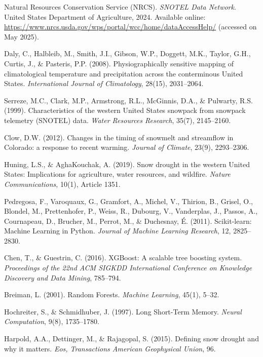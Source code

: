 \documentclass{article}
\begin{document}
\begin{thebibliography}{9}

Natural Resources Conservation Service (NRCS). 
\textit{SNOTEL Data Network}. 
United States Department of Agriculture, 2024. 
Available online: \url{https://www.nrcs.usda.gov/wps/portal/wcc/home/dataAccessHelp/} (accessed on May 2025).

Daly, C., Halbleib, M., Smith, J.I., Gibson, W.P., Doggett, M.K., Taylor, G.H., Curtis, J., \& Pasteris, P.P. (2008). 
Physiographically sensitive mapping of climatological temperature and precipitation across the conterminous United States.
\textit{International Journal of Climatology}, 28(15), 2031–2064.

Serreze, M.C., Clark, M.P., Armstrong, R.L., McGinnis, D.A., \& Pulwarty, R.S. (1999). 
Characteristics of the western United States snowpack from snowpack telemetry (SNOTEL) data.
\textit{Water Resources Research}, 35(7), 2145–2160.

Clow, D.W. (2012). 
Changes in the timing of snowmelt and streamflow in Colorado: a response to recent warming.
\textit{Journal of Climate}, 23(9), 2293–2306.

Huning, L.S., \& AghaKouchak, A. (2019). 
Snow drought in the western United States: Implications for agriculture, water resources, and wildfire.
\textit{Nature Communications}, 10(1), Article 1351.

Pedregosa, F., Varoquaux, G., Gramfort, A., Michel, V., Thirion, B., Grisel, O., Blondel, M., Prettenhofer, P., Weiss, R., Dubourg, V., Vanderplas, J., Passos, A., Cournapeau, D., Brucher, M., Perrot, M., \& Duchesnay, É. (2011). 
Scikit-learn: Machine Learning in Python.
\textit{Journal of Machine Learning Research}, 12, 2825–2830.

Chen, T., \& Guestrin, C. (2016). 
XGBoost: A scalable tree boosting system.
\textit{Proceedings of the 22nd ACM SIGKDD International Conference on Knowledge Discovery and Data Mining}, 785–794.

Breiman, L. (2001). 
Random Forests.
\textit{Machine Learning}, 45(1), 5–32.

Hochreiter, S., \& Schmidhuber, J. (1997). 
Long Short-Term Memory.
\textit{Neural Computation}, 9(8), 1735–1780.

Harpold, A.A., Dettinger, M., \& Rajagopal, S. (2015). 
Defining snow drought and why it matters.
\textit{Eos, Transactions American Geophysical Union}, 96.

\end{thebibliography}
\end{document}
